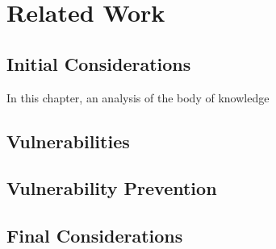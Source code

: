\chapter{Related Work}
\label{ch:referencial}

\section{Initial Considerations}
In this chapter, an analysis of the body of knowledge  

\section {Vulnerabilities}


\section {Vulnerability Prevention}


\section{Final Considerations}


